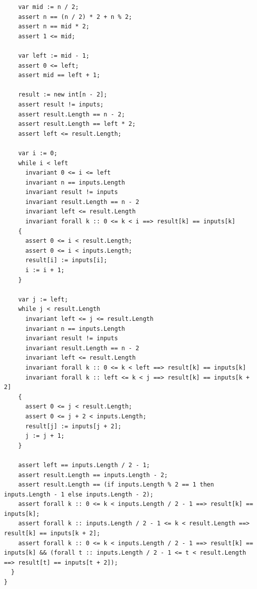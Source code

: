 \documentclass{article}
\begin{document}
\begin{lstlisting}
    var mid := n / 2;
    assert n == (n / 2) * 2 + n % 2;
    assert n == mid * 2;
    assert 1 <= mid;

    var left := mid - 1;
    assert 0 <= left;
    assert mid == left + 1;

    result := new int[n - 2];
    assert result != inputs;
    assert result.Length == n - 2;
    assert result.Length == left * 2;
    assert left <= result.Length;

    var i := 0;
    while i < left
      invariant 0 <= i <= left
      invariant n == inputs.Length
      invariant result != inputs
      invariant result.Length == n - 2
      invariant left <= result.Length
      invariant forall k :: 0 <= k < i ==> result[k] == inputs[k]
    {
      assert 0 <= i < result.Length;
      assert 0 <= i < inputs.Length;
      result[i] := inputs[i];
      i := i + 1;
    }

    var j := left;
    while j < result.Length
      invariant left <= j <= result.Length
      invariant n == inputs.Length
      invariant result != inputs
      invariant result.Length == n - 2
      invariant left <= result.Length
      invariant forall k :: 0 <= k < left ==> result[k] == inputs[k]
      invariant forall k :: left <= k < j ==> result[k] == inputs[k + 2]
    {
      assert 0 <= j < result.Length;
      assert 0 <= j + 2 < inputs.Length;
      result[j] := inputs[j + 2];
      j := j + 1;
    }

    assert left == inputs.Length / 2 - 1;
    assert result.Length == inputs.Length - 2;
    assert result.Length == (if inputs.Length % 2 == 1 then inputs.Length - 1 else inputs.Length - 2);
    assert forall k :: 0 <= k < inputs.Length / 2 - 1 ==> result[k] == inputs[k];
    assert forall k :: inputs.Length / 2 - 1 <= k < result.Length ==> result[k] == inputs[k + 2];
    assert forall k :: 0 <= k < inputs.Length / 2 - 1 ==> result[k] == inputs[k] && (forall t :: inputs.Length / 2 - 1 <= t < result.Length ==> result[t] == inputs[t + 2]);
  }
}
\end{lstlisting}
\end{document}

